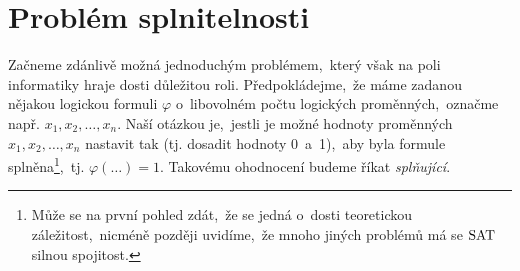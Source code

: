 \section{Problém splnitelnosti}\label{sec:general_sat}

Začneme zdánlivě možná jednoduchým problémem,~který však na poli informatiky hraje dosti důležitou roli. Předpokládejme,~že máme zadanou nějakou logickou formuli $\varphi$ o~libovolném počtu logických proměnných,~označme např. $x_1,x_2,\dots,x_n$. Naší otázkou je,~jestli je možné hodnoty proměnných $x_1,x_2,\dots,x_n$ nastavit tak (tj. dosadit hodnoty 0~a~1),~aby byla formule splněna\footnote{Může se na první pohled zdát,~že se jedná o~dosti teoretickou záležitost,~nicméně později uvidíme,~že mnoho jiných problémů má se \ensuremath{\SAT} silnou spojitost.},~tj. $\varphi(\dots)=1$. Takovému ohodnocení budeme říkat \emph{splňující}.


